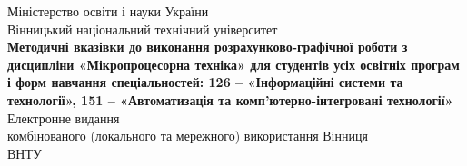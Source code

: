 \setcounter{page}{1}
\mainmatter
\onespace
\pagestyle{empty}
\begin{center}
Міністерство освіти і науки України\\
Вінницький національний технічний університет\\
\Large{\textbf{\vfill \vfill Методичні вказівки до виконання розрахунково-графічної роботи з дисципліни «Мікропроцесорна техніка» для студентів усіх освітніх програм і форм навчання спеціальностей: 126 -- «Інформаційні системи та технології», 151 -- «Автоматизація та комп’ютерно-інтегровані технології»}}
\vfill
\normalsize{Електронне видання\\
комбінованого (локального та мережного) використання}
\vfill
\vfill
\vfill
\normalsize{
Вінниця\\
ВНТУ\\
\the\year\\}
\end{center}
\newpage